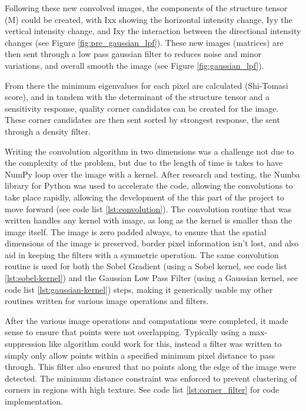 \documentclass[11pt, conference, letterpaper]{IEEEtran}
\begin{document}
Following these new convolved images, the components of the structure tensor (M) could be created, with Ixx showing the horizontal intensity change, Iyy the vertical intensity change, and Ixy the interaction between the directional intensity changes (see Figure \ref{fig:pre_gaussian_lpf}). These new images (matrices) are then sent through a low pass gaussian filter to reduces noise and minor variations, and overall smooth the image (see Figure \ref{fig:gaussian_lpf}). 

From there the minimum eigenvalues for each pixel are calculated (Shi-Tomasi score), and in tandem with the determinant of the structure tensor and a sensitivity response, quality corner candidates can be created for the image. These corner candidates are then sent sorted by strongest response, the sent through a density filter.

Writing the convolution algorithm in two dimensions was a challenge not due to the complexity of the problem, but due to the length of time is takes to have NumPy loop over the image with a kernel. After research and testing, the Numba library for Python was used to accelerate the code, allowing the convolutions to take place rapidly, allowing the development of the this part of the project to move forward (see code list \ref{lst:convolution}). The convolution routine that was written handles any kernel with image, as long as the kernel is smaller than the image itself. The image is zero padded always, to ensure that the spatial dimensions of the image is preserved, border pixel information isn't lost, and also aid in keeping the filters with a symmetric operation. The same convolution routine is used for both the Sobel Gradient (using a Sobel kernel, see code list \ref{lst:sobel-kernel}) and the Gaussian Low Pass Filter (using a Gaussian kernel, see code list \ref{lst:gaussian-kernel}) steps, making it generically usable my other routines written for various image operations and filters.

After the various image operations and computations were completed, it made sense to ensure that points were not overlapping. Typically using a max-suppression like algorithm could work for this, instead a filter was written to simply only allow points within a specified minimum pixel distance to pass through. This filter also ensured that no points along the edge of the image were detected. The minimum distance constraint was enforced to prevent clustering of corners in regions with high texture. See code list \ref{lst:corner_filter} for code implementation.
\end{document}

